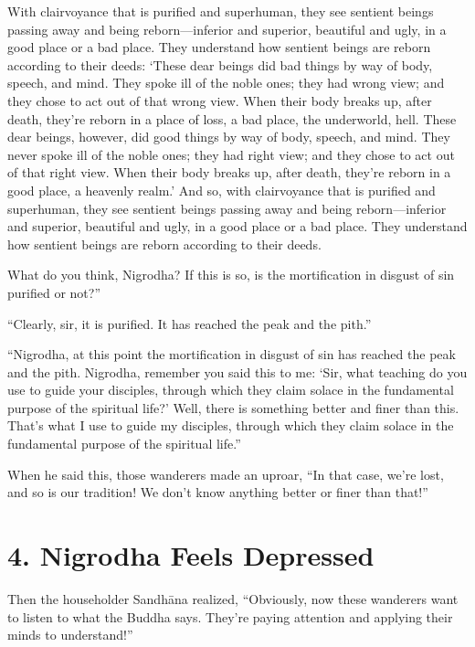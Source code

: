 \documentclass[12pt,openany]{book}%
\begin{document}
With clairvoyance that is purified and superhuman, they see sentient beings passing away and being reborn—inferior and superior, beautiful and ugly, in a good place or a bad place. They understand how sentient beings are reborn according to their deeds: ‘These dear beings did bad things by way of body, speech, and mind. They spoke ill of the noble ones; they had wrong view; and they chose to act out of that wrong view. When their body breaks up, after death, they’re reborn in a place of loss, a bad place, the underworld, hell. These dear beings, however, did good things by way of body, speech, and mind. They never spoke ill of the noble ones; they had right view; and they chose to act out of that right view. When their body breaks up, after death, they’re reborn in a good place, a heavenly realm.’ And so, with clairvoyance that is purified and superhuman, they see sentient beings passing away and being reborn—inferior and superior, beautiful and ugly, in a good place or a bad place. They understand how sentient beings are reborn according to their deeds. 

What do you think, Nigrodha? If this is so, is the mortification in disgust of sin purified or not?” 

“Clearly, sir, it is purified. It has reached the peak and the pith.” 

“Nigrodha, at this point the mortification in disgust of sin has reached the peak and the pith. Nigrodha, remember you said this to me: ‘Sir, what teaching do you use to guide your disciples, through which they claim solace in the fundamental purpose of the spiritual life?’ Well, there is something better and finer than this. That’s what I use to guide my disciples, through which they claim solace in the fundamental purpose of the spiritual life.” 

When he said this, those wanderers made an uproar, “In that case, we’re lost, and so is our tradition! We don’t know anything better or finer than that!” 

\section*{4. Nigrodha Feels Depressed }

Then the householder \textsanskrit{Sandhāna} realized, “Obviously, now these wanderers want to listen to what the Buddha says. They’re paying attention and applying their minds to understand!” 
\end{document}
